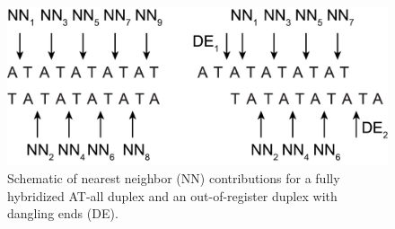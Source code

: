 \documentclass[journal=jpcbfk,manuscript=article]{achemso}
\begin{document}
\vspace{+0.5in}

\begin{figure}[ht!]
	\centering
    \includegraphics[width=.85\textwidth]{FigS6.pdf}
    \caption{Schematic of nearest neighbor (NN) contributions for a fully hybridized AT-all duplex and an out-of-register duplex with dangling ends (DE).}
    \label{fig:SIFig6}
\end{figure}

\clearpage
\newpage



\end{document}

